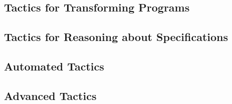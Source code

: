 \medskip











\subsection{Tactics for Transforming Programs}
\label{subsec:transformingprograms}

















\subsection{Tactics for Reasoning about Specifications}














\subsection{Automated Tactics}
\label{subsec:automatedtactics}




\subsection{Advanced Tactics}
\label{subsec:advancedtactics}



